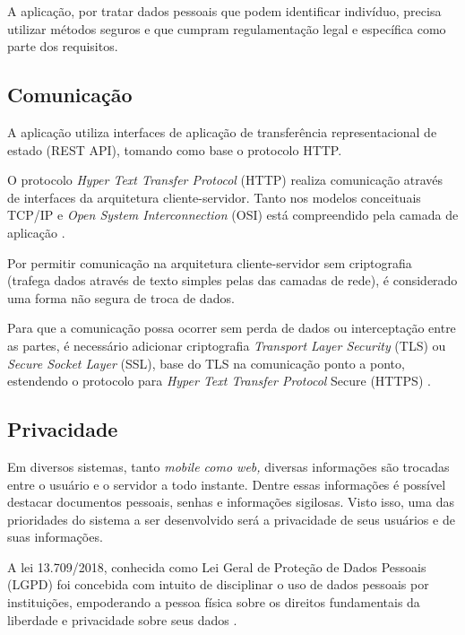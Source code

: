 \documentclass[
    12pt,               %
    openright,          %
    oneside,
    a4paper,            %
    BIBLATEX,           %
    TODO,               %
    english,            %
    brazil              %
    ]{ifsp-spo-inf-ctds}
\begin{document}
        A aplicação, por tratar dados pessoais que podem identificar indivíduo, precisa utilizar métodos seguros e que cumpram regulamentação legal e específica como parte dos requisitos.

        \subsection{Comunicação}

            A aplicação utiliza interfaces de aplicação de transferência representacional de estado (REST API), tomando como base o protocolo HTTP.

            O protocolo \emph{Hyper Text Transfer Protocol} (HTTP) realiza comunicação através de interfaces da arquitetura cliente-servidor. Tanto nos modelos conceituais TCP/IP e \emph{Open System Interconnection} (OSI) está compreendido pela camada de aplicação .

            Por permitir comunicação na arquitetura cliente-servidor sem criptografia (trafega dados através de texto simples pelas das camadas de rede), é considerado uma forma não segura de troca de dados.

            Para que a comunicação possa ocorrer sem perda de dados ou interceptação entre as partes, é necessário adicionar criptografia \emph{Transport Layer Security} (TLS) ou \emph{Secure Socket Layer} (SSL), base do TLS na comunicação ponto a ponto, estendendo o protocolo para \emph{Hyper Text Transfer Protocol} Secure (HTTPS) .

        \subsection{Privacidade}

            Em diversos sistemas, tanto \emph{mobile como web,} diversas informações são trocadas entre o usuário e o servidor a todo instante. Dentre essas informações é possível destacar documentos pessoais, senhas e informações sigilosas. Visto isso, uma das prioridades do sistema a ser desenvolvido será a privacidade de seus usuários e de suas informações.

            A lei 13.709/2018, conhecida como Lei Geral de Proteção de Dados Pessoais (LGPD) foi concebida com intuito de disciplinar o uso de dados pessoais por instituições, empoderando a pessoa física sobre os direitos fundamentais da liberdade e privacidade sobre seus dados .
\end{document}
